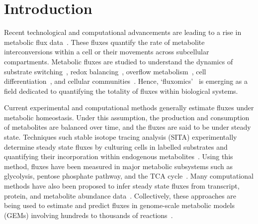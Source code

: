 \documentclass[12pt]{article}
\begin{document}
\clearpage

\section*{Introduction} %

Recent technological and computational advancements are leading to a rise in
metabolic flux
data~\citep{LeeWonDong2019Spas,WangLin2022Srit,WangRuohong2022Gstm}. These
fluxes quantify the rate of metabolite interconversions within a cell or their
movements across subcellular compartments. Metabolic fluxes are studied to
understand the dynamics of substrate
switching~\citep{ZampieriMattia2012Rmuc,KochanowskiKarl2021Gcom}, redox
balancing~\citep{McKinlayJamesB2010Cdfa,FranchinaDavideG2022Grbc}, overflow
metabolism~\citep{BasanMarkus2015OmiE,VanderHeidenMatthewG2009UtWE}, cell
differentiation~\citep{EndoYusuke2022Fami,BenjaminJacksonT2024Mrot}, and
cellular
communities~\citep{SchuetzRobert2012MOoM,YuJasonSL2022Mcfr,Gustafsson2024Mcbc}.
Hence, `fluxomics'~\citep{EmwasAbdul-Hamid2022F-NM,SanfordKarl2002Gtfa} is
emerging as a field dedicated to quantifying the totality of fluxes within
biological systems.

Current experimental and computational methods generally estimate fluxes
under metabolic homeostasis. Under this assumption, the production and
consumption of metabolites are balanced over time, and the fluxes are said
to be under steady state. Techniques such stable isotope tracing analysis
(SITA) experimentally determine steady state fluxes by culturing cells in
labelled substrates and quantifying their incorporation within endogenous
metabolites~\citep{BuescherJoergM2015Arfi,AntoniewiczMaciekR2018Agt1}.
Using this method, fluxes have been measured in major metabolic subsystems
such as glycolysis, pentose phosphate pathway, and the TCA
cycle~\citep{OrthJeffreyD2010RaUo,AhnEunyong2017Tfro,WuChao2019FARC}. Many
computational methods have also been proposed to infer steady state fluxes
from transcript, protein, and metabolite abundance
data~\citep{UematsuSaori2022Mlmf,GonzalezArrueNicolas2023Peom,HuangYuefan2023Ccmf,KasteJoshuaAM2023Afpu,LeeJustinY2023Tiac}.
Collectively, these approaches are being used to estimate and predict
fluxes in genome-scale metabolic models (GEMs) involving hundreds to
thousands of
reactions~\citep{NilssonAvlant2020Qaoa,CherkaouiSarah2022Afao,GelbachPatrickE2024Fsig}.
\end{document}
